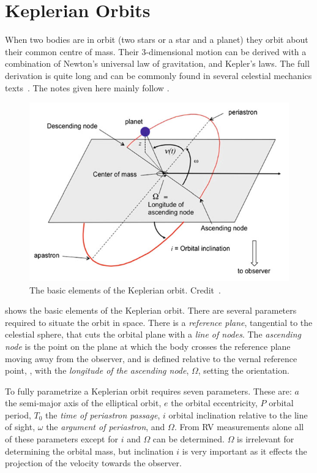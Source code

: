 

\section{Keplerian Orbits}

When two bodies are in orbit (two stars or a star and a planet) they orbit about their common centre of mass.
Their 3-dimensional motion can be derived with a combination of Newton's universal law of gravitation, and Kepler's laws.
The full derivation is quite long and can be commonly found in several celestial mechanics texts~\citep[e.g.][]{moulton_introduction_1914, perryman_exoplanet_2011, fitzpatrick_introduction_2012}.
The notes given here mainly follow \citep{bozza_methods_2016}.

\begin{figure}
    \centering
    \includegraphics[width=0.5\linewidth]{figures/fundamental_rv/orbit_diagram}
    \caption{The basic elements of the Keplerian orbit. Credit~\citep{bozza_methods_2016}.}
    \label{fig:orbitdiagram}
\end{figure}

 shows the basic elements of the Keplerian orbit.
There are several parameters required to situate the orbit in space.
There is a \textit{reference plane}, tangential to the celestial sphere, that cuts the orbital plane with a \textit{line of nodes}.
The \textit{ascending node} is the point on the plane at which the body crosses the reference plane moving away from the observer, and is defined relative to the vernal reference point, \Aries, with the \textit{longitude of the ascending node}, $\Omega$, setting the orientation.

To fully parametrize a Keplerian orbit requires seven parameters.
These are: $a$ the semi-major axis of the elliptical orbit, $e$ the orbital eccentricity, $P$ orbital period, $T_0$ the \emph{time of periastron passage}, $i$ orbital inclination relative to the line of sight, $\omega$ the \emph{argument of periastron}, and $\Omega$.
From RV measurements alone all of these parameters except for $i$ and $\Omega$ can be determined.
$\Omega$ is irrelevant for determining the orbital mass, but inclination $i$ is very important as it effects the projection of the velocity towards the observer.


